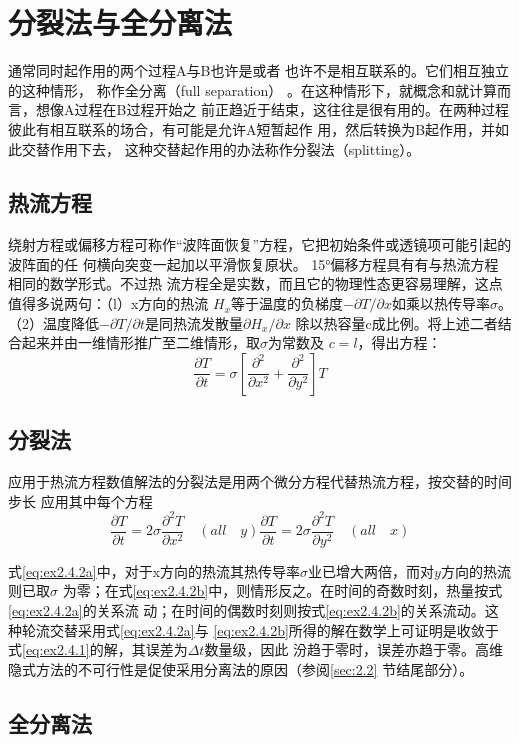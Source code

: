 \section{分裂法与全分离法}
\label{sec:2.4}
通常同时起作用的两个过程A与B也许是或者
也许不是相互联系的。它们相互独立的这种情形， 称作全分离（full separation）
。在这种情形下，就概念和就计算而言，想像A过程在B过程开始之
前正趋近于结束，这往往是很有用的。在两种过程
彼此有相互联系的场合，有可能是允许A短暂起作
用，然后转换为B起作用，并如此交替作用下去，
这种交替起作用的办法称作分裂法（splitting）。

\subsection{热流方程}
\label{sec:2.4.1}
绕射方程或偏移方程可称作“波阵面恢复”方程，它把初始条件或透镜项可能引起的波阵面的任
何横向突变一起加以平滑恢复原状。
15°偏移方程具有有与热流方程相同的数学形式。不过热
流方程全是实数，而且它的物理性态更容易理解，这点值得多说两句：（l）x方向的热流
$H_x$等于温度的负梯度$-\partial T/\partial x$如乘以热传导率$\sigma$。（2）温度降低$-\partial T/\partial t$是同热流发散量$\partial H_x/\partial x$
除以热容量c成比例。将上述二者结合起来并由一维情形推广至二维情形，取$\sigma$为常数及
$c=l$，得出方程：
\begin{equation}
\frac{\partial T}{\partial t}=\sigma[\frac{\partial^2}{\partial x^2}+\frac{\partial^2}{\partial y^2}]T
\label{eq:ex2.4.1}
\end{equation}

\subsection{分裂法}
\label{sec:2.4.2}
应用于热流方程数值解法的分裂法是用两个微分方程代替热流方程，按交替的时间步长
应用其中每个方程
\begin{subequations}
\begin{equation}
\frac{\partial T}{\partial t}=2\sigma\frac{\partial^2 T}{\partial x^2} \quad (all\quad y)
\label{eq:ex2.4.2a}
\end{equation}
\begin{equation}
\frac{\partial T}{\partial t}=2\sigma\frac{\partial^2 T}{\partial y^2} \quad (all\quad x)
\label{eq:ex2.4.2b}
\end{equation}
\label{eq:ex2.4.2}
\end{subequations}

式\ref{eq:ex2.4.2a}中，对于x方向的热流其热传导率$\sigma$业已增大两倍，而对$y$方向的热流则已取$\sigma$
为零；在式\ref{eq:ex2.4.2b}中，则情形反之。在时间的奇数时刻，热量按式\ref{eq:ex2.4.2a}的关系流
动；在时间的偶数时刻则按式\ref{eq:ex2.4.2b}的关系流动。这种轮流交替采用式\ref{eq:ex2.4.2a}与
\ref{eq:ex2.4.2b}所得的解在数学上可证明是收敛于式\ref{eq:ex2.4.1}的解，其误差为$\Delta t$数量级，因此
汾趋于零时，误差亦趋于零。高维隐式方法的不可行性是促使采用分离法的原因（参阅\ref{sec:2.2}
节结尾部分）。

\subsection{全分离法}
\label{sec:2.4.3}
